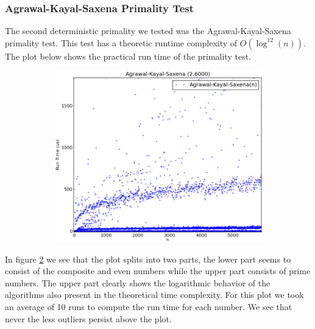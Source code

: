 \documentclass[compressed,final,notitlepage,narroweqnarray,inline,twoside,]{ieee}
\begin{document}
\subsubsection{Agrawal-Kayal-Saxena Primality Test}
The second deterministic primality we tested was the Agrawal-Kayal-Saxena primality test. This test has a theoretic runtime complexity of $O(\log^{12}(n))$. The plot below shows the practical run time of the primality test.
\begin{figure}
        \centering
        \begin{subfigure}[b]{0.5\textwidth}
                \includegraphics[width=\textwidth]{../images/AKS}
                \label{fig:gull}
        \end{subfigure}
        \vspace{-30pt}\caption{}\label{fig:aks_runtime_small}
\end{figure}
In figure \ref{fig:aks_runtime_small} we see that the plot splits into two parts, the lower part seems to consist of the composite and even numbers while the upper part consists of prime numbers. The upper part clearly shows the logarithmic behavior of the algorithms also present in the theoretical time complexity. For this plot we took an average of 10 runs to compute the run time for each number. We see that never the less outliers persist above the plot. 
\end{document}
